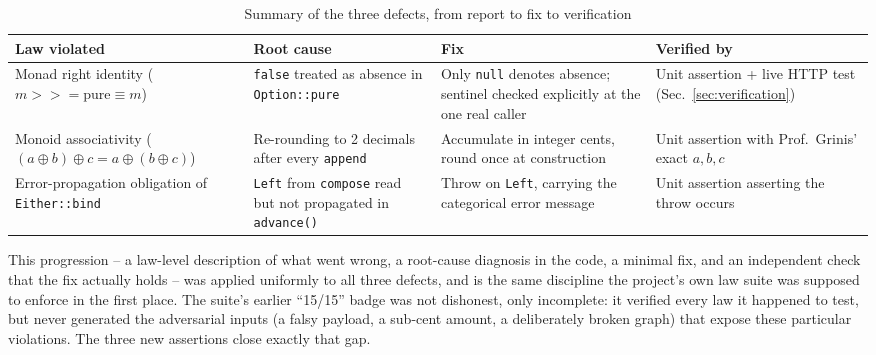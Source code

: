 \begin{table}[!ht]\centering
\caption{Summary of the three defects, from report to fix to verification}
\label{tabl:summary}
\small
\begin{tabular}{|p{2.6cm}|p{3.6cm}|p{4.3cm}|p{3.3cm}|}\hline
\textbf{Law violated} & \textbf{Root cause} & \textbf{Fix} & \textbf{Verified by} \\\hline
Monad right identity ($m\mathbin{>\!\!>\!\!=}\mathrm{pure}\equiv m$) & \texttt{false} treated as absence in \texttt{Option::pure} & Only \texttt{null} denotes absence; sentinel checked explicitly at the one real caller & Unit assertion + live HTTP test (Sec.~\ref{sec:verification}) \\\hline
Monoid associativity ($(a\oplus b)\oplus c = a\oplus(b\oplus c)$) & Re-rounding to 2 decimals after every \texttt{append} & Accumulate in integer cents, round once at construction & Unit assertion with Prof.~Grinis' exact $a,b,c$ \\\hline
Error-propagation obligation of \texttt{Either::bind} & \texttt{Left} from \texttt{compose} read but not propagated in \texttt{advance()} & Throw on \texttt{Left}, carrying the categorical error message & Unit assertion asserting the throw occurs \\\hline
\end{tabular}
\end{table}

This progression -- a law-level description of what went wrong, a root-cause diagnosis in the code, a minimal fix, and an independent check that the fix actually holds -- was applied uniformly to all three defects, and is the same discipline the project's own law suite was supposed to enforce in the first place. The suite's earlier ``15/15'' badge was not dishonest, only incomplete: it verified every law it happened to test, but never generated the adversarial inputs (a falsy payload, a sub-cent amount, a deliberately broken graph) that expose these particular violations. The three new assertions close exactly that gap.
